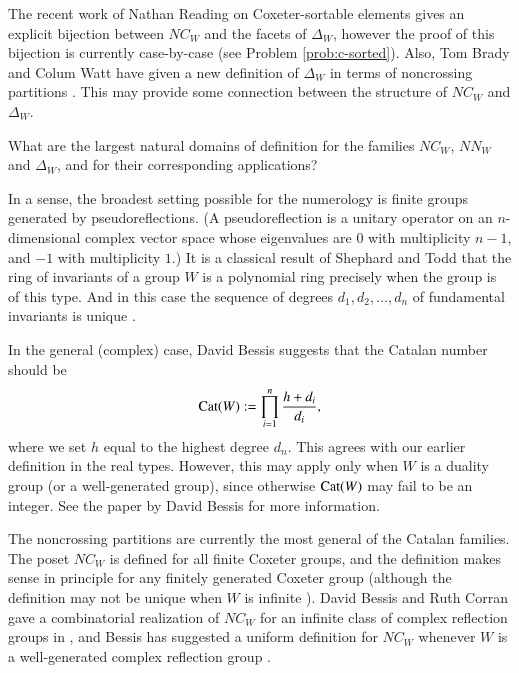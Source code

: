 \documentclass[12pt,letterpaper, reqno]{aimpl}
\newcommand{\Cat}{{\rm Cat}}
\begin{document}
\begin{problemblock}
\begin{remark}The recent work of Nathan Reading on Coxeter-sortable elements
\cite{reading} gives an explicit bijection between $NC_W$ and the
facets of $\Delta_W$, however the proof of this bijection is currently
case-by-case (see Problem \ref{prob:c-sorted}). Also, Tom Brady and Colum
Watt have given a new definition of $\Delta_W$ in terms of noncrossing
partitions \cite{brady-watt}. This may provide some connection between
the structure of $NC_W$ and $\Delta_W$.
\end{remark}

\end{problemblock}


\begin{problemblock}

\begin{problem}[1.3]\label{central:two} What are the largest natural domains of definition for the families $NC_W$, $NN_W$ and $\Delta_W$, and for their corresponding applications?\end{problem}

\begin{remark}
In a sense, the broadest setting possible for the numerology is  finite
groups generated by pseudoreflections. (A pseudoreflection is a unitary
operator on an $n$-dimensional complex vector space whose eigenvalues
are $0$ with multiplicity $n-1$, and $-1$ with multiplicity $1$.) It is
a classical result of Shephard and Todd that the ring of invariants of
a group $W$ is a polynomial ring precisely when the group is of this
type. And in this case the sequence of degrees $d_1,d_2,\ldots,d_n$
of fundamental invariants is unique \cite{shephard-todd}.

In the general (complex) case, David Bessis suggests that the Catalan number should be
\begin{equation*}
\Cat(W):= \prod_{i=1}^n  \frac{h+d_i}{d_i},
\end{equation*}
where we set $h$ equal to the highest degree $d_n$. This agrees with our earlier definition in the real types. However, this may apply only when $W$ is a duality group (or a well-generated group), since otherwise $\Cat(W)$ may fail to be an integer. See the paper \cite{bessis:complex} by David Bessis for more information.
\end{remark}

\begin{remark}
The noncrossing partitions are currently the most general of the Catalan families. The poset $NC_W$ is defined for all finite Coxeter groups, and the definition makes sense in principle for any finitely generated Coxeter group (although the definition may not be unique when $W$ is infinite \cite{mccammond-etal}). David Bessis and Ruth Corran gave a combinatorial realization of $NC_W$ for an infinite class of complex reflection groups in \cite{bessis-corran}, and Bessis has suggested a uniform definition for $NC_W$ whenever $W$ is a well-generated complex reflection group \cite{bessis:complex}.
\end{remark}


\end{problemblock}
\end{document}
